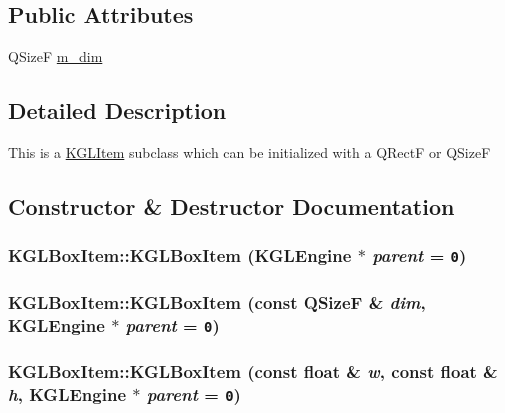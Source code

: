 \subsection*{Public Attributes}
\begin{CompactItemize}
\item 
QSizeF \hyperlink{class_k_g_l_box_item_1511f877831d9658a7ddbc543de61a53}{m\_\-dim}
\end{CompactItemize}


\subsection{Detailed Description}
This is a \hyperlink{class_k_g_l_item}{KGLItem} subclass which can be initialized with a QRectF or QSizeF 

\subsection{Constructor \& Destructor Documentation}
\hypertarget{class_k_g_l_box_item_5c992045e6437b80c34fad9ac41f7dcc}{
\subsubsection[{KGLBoxItem}]{\setlength{\rightskip}{0pt plus 5cm}KGLBoxItem::KGLBoxItem ({\bf KGLEngine} $\ast$ {\em parent} = {\tt 0})}}
\label{class_k_g_l_box_item_5c992045e6437b80c34fad9ac41f7dcc}


\hypertarget{class_k_g_l_box_item_a9007cf09702c340fa0b8b5a38316977}{
\subsubsection[{KGLBoxItem}]{\setlength{\rightskip}{0pt plus 5cm}KGLBoxItem::KGLBoxItem (const QSizeF \& {\em dim}, \/  {\bf KGLEngine} $\ast$ {\em parent} = {\tt 0})}}
\label{class_k_g_l_box_item_a9007cf09702c340fa0b8b5a38316977}


\hypertarget{class_k_g_l_box_item_e8f3c118be13227998e02c7bf52bb2e1}{
\subsubsection[{KGLBoxItem}]{\setlength{\rightskip}{0pt plus 5cm}KGLBoxItem::KGLBoxItem (const float \& {\em w}, \/  const float \& {\em h}, \/  {\bf KGLEngine} $\ast$ {\em parent} = {\tt 0})}}
\label{class_k_g_l_box_item_e8f3c118be13227998e02c7bf52bb2e1}




